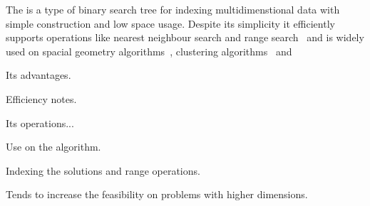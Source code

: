 The \kdtree{} is a type of binary search tree for indexing multidimenstional
data with simple construction and low space usage.
Despite its simplicity it efficiently supports operations like nearest
neighbour search and range search~\cite{bentley1975} and is widely used on
spacial geometry algorithms~\cite{preparata2012computational, guttman1984r}, 
clustering algorithms~\cite{kanungo2002efficient, indyk1998approximate}
and ~\cite{owens2007survey}


Its advantages.

Efficiency notes.

Its operations...

Use on the algorithm.

Indexing the solutions and range operations.

Tends to increase the feasibility on problems with higher dimensions.
